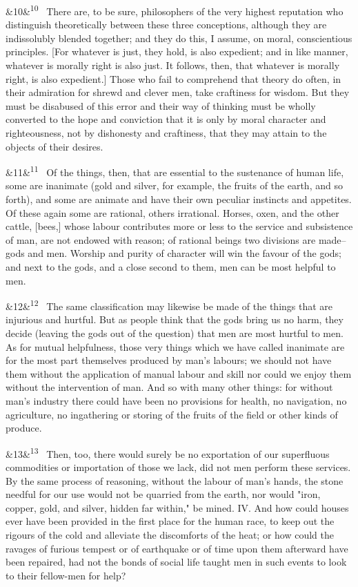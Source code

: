 \documentclass[12pt]{article}
\newcommand{\para}[1][]{\par\noindent\ifx&#1&\else\textsuperscript{\footnotesize #1}~\fi}
\begin{document}
\para[10] There are, to be sure, philosophers of the very highest reputation who distinguish theoretically between these three conceptions, although they are indissolubly blended together; and they do this, I assume, on moral, conscientious principles. [For whatever is just, they hold, is also expedient; and in like manner, whatever is morally right is also just. It follows, then, that whatever is morally right, is also expedient.] Those who fail to comprehend that theory do often, in their admiration for shrewd and clever men, take craftiness for wisdom. But they must be disabused of this error and their way of thinking must be wholly converted to the hope and conviction that it is only by moral character and righteousness, not by dishonesty and craftiness, that they may attain to the objects of their desires.

\para[11] Of the things, then, that are essential to the sustenance of human life, some are inanimate (gold and silver, for example, the fruits of the earth, and so forth), and some are animate and have their own peculiar instincts and appetites. Of these again some are rational, others irrational. Horses, oxen, and the other cattle, [bees,] whose labour contributes more or less to the service and subsistence of man, are not endowed with reason; of rational beings two divisions are made--gods and men. Worship and purity of character will win the favour of the gods; and next to the gods, and a close second to them, men can be most helpful to men.

\para[12] The same classification may likewise be made of the things that are injurious and hurtful. But as people think that the gods bring us no harm, they decide (leaving the gods out of the question) that men are most hurtful to men. As for mutual helpfulness, those very things which we have called inanimate are for the most part themselves produced by man's labours; we should not have them without the application of manual labour and skill nor could we enjoy them without the intervention of man. And so with many other things: for without man's industry there could have been no provisions for health, no navigation, no agriculture, no ingathering or storing of the fruits of the field or other kinds of produce.

\para[13] Then, too, there would surely be no exportation of our superfluous commodities or importation of those we lack, did not men perform these services. By the same process of reasoning, without the labour of man's hands, the stone needful for our use would not be quarried from the earth, nor would "iron, copper, gold, and silver, hidden far within," be mined. IV. And how could houses ever have been provided in the first place for the human race, to keep out the rigours of the cold and alleviate the discomforts of the heat; or how could the ravages of furious tempest or of earthquake or of time upon them afterward have been repaired, had not the bonds of social life taught men in such events to look to their fellow-men for help?
\end{document}
